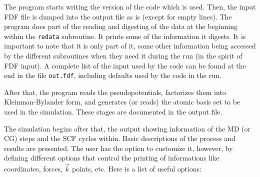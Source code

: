 \documentclass[11pt]{article}
\begin{document}
The program starts writing the version of
the code which is used. Then, the input FDF file is dumped into
the output file as is (except for empty lines). The program does
part of the reading and digesting of the data at the beginning
within the {\tt redata} subroutine. It prints some of the information
it digests. It is important to note that it is only part of it,
some other information being accessed by the different subroutines
when they need it during the run (in the spirit of FDF input).
A complete list of the input used by the code can be found at the
end in the file {\tt out.fdf}, including defaults used by the code
in the run.

After that, the program reads the pseudopotentials, factorizes them
into Kleinman-Bylander form, and generates (or reads) the atomic basis
set to be used in the simulation. These stages are documented in the
output file.

The simulation begins after that, the output showing information of
the MD (or CG) steps and the SCF cycles within.  Basic descriptions of
the process and results are presented. The user has the option to
customize it, however, by defining
different options that control the printing of informations like
coordinates, forces, $\vec k$ points, etc.  Here is a list of useful
options:
 
\end{document}
